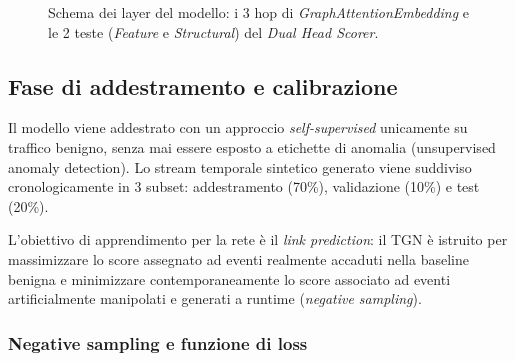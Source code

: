 \begin{figure}[H]
\caption{Schema dei layer del modello: i 3 hop di \textit{GraphAttentionEmbedding} e le 2 teste (\textit{Feature} e \textit{Structural}) del \textit{Dual Head Scorer}.}
\label{fig:layers}
\end{figure}


\subsection{Fase di addestramento e calibrazione}

Il modello viene addestrato con un approccio \textit{self-supervised} unicamente su traffico benigno, senza mai essere esposto a etichette di anomalia (unsupervised anomaly detection). Lo stream temporale sintetico generato viene suddiviso cronologicamente in 3 subset: addestramento (70\%), validazione (10\%) e test (20\%).

L'obiettivo di apprendimento per la rete è il \textit{link prediction}: il TGN è istruito per massimizzare lo score assegnato ad eventi realmente accaduti nella baseline benigna e minimizzare contemporaneamente lo score associato ad eventi artificialmente manipolati e generati a runtime (\textit{negative sampling}).

\subsubsection{Negative sampling e funzione di loss}

